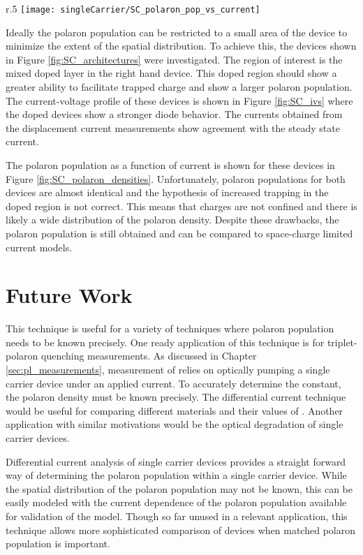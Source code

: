 \documentclass[../thesis.tex]{subfiles}
\begin{document}
\begin{wrapfigure}{r}{.5\textwidth}
    \centering%
    \texttt{[image: singleCarrier/SC\_polaron\_pop\_vs\_current]}
    \caption{Polaron population as a function of current for the devices in Figure \ref{fig:SC_architectures}}
    \label{fig:SC_polaron_densities}
\end{wrapfigure}

Ideally the polaron population can be restricted to a small area of the device to minimize the extent of the spatial distribution.  
To achieve this, the devices shown in Figure \ref{fig:SC_architectures} were investigated.
The region of interest is the mixed doped layer in the right hand device.
This doped region should show a greater ability to facilitate trapped charge and show a larger polaron population.
The current-voltage profile of these devices is shown in Figure \ref{fig:SC_ivs} where the doped devices show a stronger diode behavior.
The currents obtained from the displacement current measurements show agreement with the steady state current.

The polaron population as a function of current is shown for these devices in Figure \ref{fig:SC_polaron_densities}.
Unfortunately, polaron populations for both devices are almost identical and the hypothesis of increased trapping in the doped region is not correct.
This means that charges are not confined and there is likely a wide distribution of the polaron density.
Despite these drawbacks, the polaron population is still obtained and can be compared to space-charge limited current models.

\section{Future Work}

This technique is useful for a variety of techniques where polaron population needs to be known precisely.
One ready application of this technique is for triplet-polaron quenching measurements.
As discussed in Chapter \ref{sec:pl_measurements}, measurement of \ktp relies on optically pumping a single carrier device under an applied current.
To accurately determine the constant, the polaron density must be known precisely.
The differential current technique would be useful for comparing different materials and their values of \ktp.
Another application with similar motivations would be the optical degradation of single carrier devices.  

Differential current analysis of single carrier devices provides a straight forward way of determining the polaron population within a single carrier device.
While the spatial distribution of the polaron population may not be known, this can be easily modeled with the current dependence of the polaron population available for validation of the model.
Though so far unused in a relevant application, this technique allows more sophisticated comparison of devices when matched polaron population is important.









\end{document}
